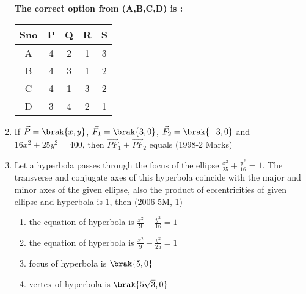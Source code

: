 \begin{enumerate}
\begin{multicols}{2}
\begin{enumerate}
\end{enumerate}
\end{multicols}
\textbf{The correct option from (A,B,C,D) is :}

\begin{table}[h]
\centering

\begin{tabular}{|c|c|c|c|c|}
\hline
Sno & P & Q & R & S \\ \hline
A & 4 & 2 & 1 & 3 \\ \hline
B & 4 & 3 & 1 & 2 \\ \hline
C & 4 & 1 & 3 & 2 \\ \hline
D & 3 & 4 & 2 & 1 \\ \hline
\end{tabular}
\end{table}
\item If $\vec{P}=\brak{x,y}$, $\vec{F}_{1}=\brak{3,0}$, $\vec{F}_{2}=\brak{-3,0}$ and $16x^2+25y^2=400$, then $\vec{PF}_{1}+\vec{PF}_{2}$ equals \hfill(1998-2 Marks)\\
	\begin{enumerate}
	\end{enumerate}

\item Let a hyperbola passes through the focus of the ellipse $\frac{x^2}{25}+\frac{y^2}{16}=1$. The transverse and conjugate axes of this hyperbola coincide with the major and minor axes of the given ellipse, also the product of eccentricities of given ellipse and hyperbola is $1$, then \hfill (2006-5M,-1)\\
	\begin{enumerate}
		\item the equation of hyperbola is $\frac{x^2}{9}-\frac{y^2}{16}=1$
		\item the equation of hyperbola is $\frac{x^2}{9}-\frac{y^2}{25}=1$
		\item focus of hyperbola is $\brak{5,0}$
		\item vertex of hyperbola is $\brak{5\sqrt{3},0}$
	\end{enumerate}


\end{enumerate}
